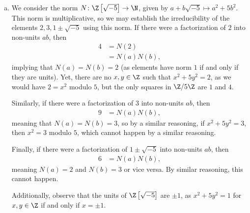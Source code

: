 \documentclass[10pt]{mypackage}
\begin{document}
\begin{solution}\hfill
  \begin{enumerate}[(a)]
    \item We consider the norm $N\colon \Z\left[ \sqrt{-5} \right]\rightarrow \N$, given by $a + b\sqrt{-5}\mapsto a^2 + 5b^2$. This norm is multiplicative, so we may establish the irreducibility of the elements $2,3,1\pm\sqrt{-5}$ using this norm. If there were a factorization of $2$ into non-units $ab$, then
      \begin{align*}
        4 &= N(2)\\
          &= N(a)N(b),
      \end{align*}
      implying that $N(a)=N(b)=2$ (as elements have norm $1$ if and only if they are units). Yet, there are no $x,y\in \Z$ such that $x^2 + 5y^2 = 2$, as we would have $2 = x^2$ modulo $5$, but the only squares in $\Z/5\Z$ are $1$ and $4$.\newline

      Similarly, if there were a factorization of $3$ into non-units $ab$, then
      \begin{align*}
        9 &= N(a)N(b),
      \end{align*}
      meaning that $N(a) = N(b) = 3$, so by a similar reasoning, if $x^2 + 5y^2 = 3$, then $x^2 = 3$ modulo $5$, which cannot happen by a similar reasoning.\newline

      Finally, if there were a factorization of $1\pm \sqrt{-5}$ into non-units $ab$, then
      \begin{align*}
        6 &= N(a)N(b),
      \end{align*}
      meaning $N(a) = 2$ and $N(b) = 3$ or vice versa. By similar reasoning, this cannot happen.\newline

      Additionally, observe that the units of $\Z\left[ \sqrt{-5} \right]$ are $\pm 1$, as $x^2 + 5y^2 = 1$ for $x,y\in \Z$ if and only if $x = \pm 1$.\newline


\end{enumerate}
\end{solution}
\end{document}
